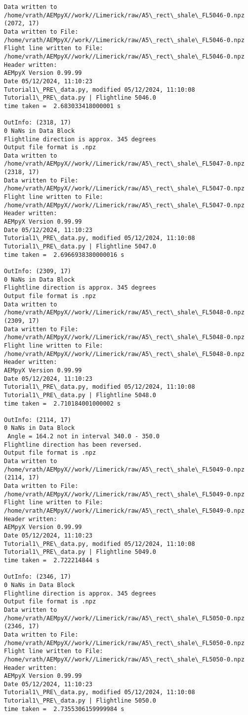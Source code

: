 \documentclass[11pt]{article}
\begin{document}
    \begin{Verbatim}[commandchars=\\\{\}]
Data written to
/home/vrath/AEMpyX//work//Limerick/raw/A5\_rect\_shale\_FL5046-0.npz
(2072, 17)
Data written to File:
/home/vrath/AEMpyX//work//Limerick/raw/A5\_rect\_shale\_FL5046-0.npz
Flight line written to File:
/home/vrath/AEMpyX//work//Limerick/raw/A5\_rect\_shale\_FL5046-0.npz
Header written:
AEMpyX Version 0.99.99
Date 05/12/2024, 11:10:23
Tutorial1\_PRE\_data.py, modified 05/12/2024, 11:10:08
Tutorial1\_PRE\_data.py | Flightline 5046.0
time taken =  2.683033418000001 s

OutInfo: (2318, 17)
0 NaNs in Data Block
Flightline direction is approx. 345 degrees
Output file format is .npz
Data written to
/home/vrath/AEMpyX//work//Limerick/raw/A5\_rect\_shale\_FL5047-0.npz
(2318, 17)
Data written to File:
/home/vrath/AEMpyX//work//Limerick/raw/A5\_rect\_shale\_FL5047-0.npz
Flight line written to File:
/home/vrath/AEMpyX//work//Limerick/raw/A5\_rect\_shale\_FL5047-0.npz
Header written:
AEMpyX Version 0.99.99
Date 05/12/2024, 11:10:23
Tutorial1\_PRE\_data.py, modified 05/12/2024, 11:10:08
Tutorial1\_PRE\_data.py | Flightline 5047.0
time taken =  2.6966938380000016 s

OutInfo: (2309, 17)
0 NaNs in Data Block
Flightline direction is approx. 345 degrees
Output file format is .npz
Data written to
/home/vrath/AEMpyX//work//Limerick/raw/A5\_rect\_shale\_FL5048-0.npz
(2309, 17)
Data written to File:
/home/vrath/AEMpyX//work//Limerick/raw/A5\_rect\_shale\_FL5048-0.npz
Flight line written to File:
/home/vrath/AEMpyX//work//Limerick/raw/A5\_rect\_shale\_FL5048-0.npz
Header written:
AEMpyX Version 0.99.99
Date 05/12/2024, 11:10:23
Tutorial1\_PRE\_data.py, modified 05/12/2024, 11:10:08
Tutorial1\_PRE\_data.py | Flightline 5048.0
time taken =  2.710184001000002 s

OutInfo: (2114, 17)
0 NaNs in Data Block
 Angle = 164.2 not in interval 340.0 - 350.0
Flightline direction has been reversed.
Output file format is .npz
Data written to
/home/vrath/AEMpyX//work//Limerick/raw/A5\_rect\_shale\_FL5049-0.npz
(2114, 17)
Data written to File:
/home/vrath/AEMpyX//work//Limerick/raw/A5\_rect\_shale\_FL5049-0.npz
Flight line written to File:
/home/vrath/AEMpyX//work//Limerick/raw/A5\_rect\_shale\_FL5049-0.npz
Header written:
AEMpyX Version 0.99.99
Date 05/12/2024, 11:10:23
Tutorial1\_PRE\_data.py, modified 05/12/2024, 11:10:08
Tutorial1\_PRE\_data.py | Flightline 5049.0
time taken =  2.722214844 s

OutInfo: (2346, 17)
0 NaNs in Data Block
Flightline direction is approx. 345 degrees
Output file format is .npz
Data written to
/home/vrath/AEMpyX//work//Limerick/raw/A5\_rect\_shale\_FL5050-0.npz
(2346, 17)
Data written to File:
/home/vrath/AEMpyX//work//Limerick/raw/A5\_rect\_shale\_FL5050-0.npz
Flight line written to File:
/home/vrath/AEMpyX//work//Limerick/raw/A5\_rect\_shale\_FL5050-0.npz
Header written:
AEMpyX Version 0.99.99
Date 05/12/2024, 11:10:23
Tutorial1\_PRE\_data.py, modified 05/12/2024, 11:10:08
Tutorial1\_PRE\_data.py | Flightline 5050.0
time taken =  2.7355306159999984 s


\end{Verbatim}
\end{document}
